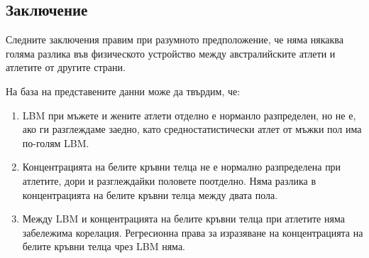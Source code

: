 \documentclass[12pt]{article}
\begin{document}
\begin{large}
\section{Заключение}
Следните заключения правим при  разумното предположение, че няма някаква голяма разлика във физическото устройство между австралийските атлети и атлетите от другите страни. \par
На база на представените данни може да твърдим, че:
\begin{enumerate}
\item LBM при мъжете и жените атлети отделно е норманло разпределен, но не е, ако ги разглеждаме заедно, като средностатистически атлет от мъжки пол има по-голям LBM.
\item Концентрацията на белите кръвни телца не е нормално разпределена при атлетите, дори и разглеждайки половете поотделно. Няма разлика в концентрацията на белите кръвни телца между двата пола.
\item Между LBM и концентрацията на белите кръвни телца при атлетите няма забележима корелация. Регресионна права за изразяване на концентрацията на белите кръвни телца чрез LBM няма.
\end{enumerate}
\end{large}
\end{document}
